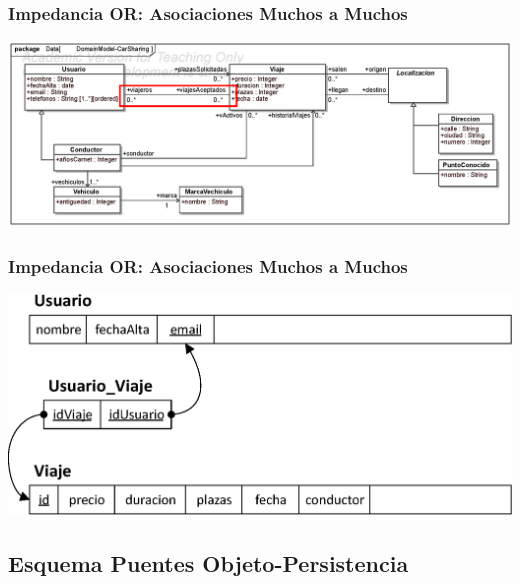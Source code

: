 \documentclass[a4paper,slidestop,xcolor=pst,blue]{beamer}
\begin{document}
\begin{frame}[c]
    \frametitle{Impedancia OR: Asociaciones Muchos a Muchos}
    \begin{center}
        \includegraphics[width=\linewidth]{images/ooMismatch/ooMismatch07.eps}
    \end{center}
\end{frame}

\begin{frame}[c]
    \frametitle{Impedancia OR: Asociaciones Muchos a Muchos}
    \begin{center}
        \includegraphics[width=0.8\linewidth]{images/ooMismatch/ooMismatch08.eps}
    \end{center}
\end{frame}

\subsection{Esquema Puentes Objeto-Persistencia}
\end{document}
